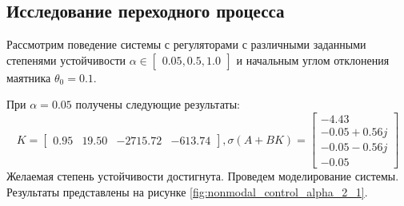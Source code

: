 \subsection{Исследование переходного процесса}
Рассмотрим поведение системы с регуляторами с различными заданными степенями устойчивости 
$\alpha \in \begin{bmatrix}0.05, 0.5, 1.0\end{bmatrix}$ и начальным углом отклонения маятника 
$\theta_0 = 0.1$. 

При $\alpha = 0.05$ получены следующие результаты: 
\begin{equation}
    K = \begin{bmatrix} 0.95  & 19.50  & -2715.72  & -613.74 \end{bmatrix}, \sigma(A + BK) = \begin{bmatrix} -4.43 \\ -0.05 + 0.56j \\ -0.05 - 0.56j \\ -0.05  \end{bmatrix}
\end{equation}
Желаемая степень устойчивости достигнута. Проведем моделирование системы. Результаты 
представлены на рисунке \ref{fig:nonmodal_control_alpha_2_1}.

